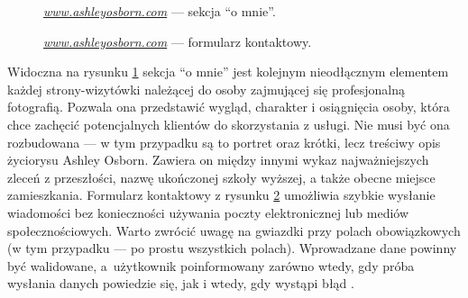 \documentclass[a4paper, 12pt, twoside]{article}
\numberwithin{figure}{section}
\begin{document}
\begin{sloppypar}
\begin{figure}[H] 
    \centering
   \caption{\textit{\url{www.ashleyosborn.com}} --- sekcja ``o mnie''.}
   \label{fig:ashley-2.jpg}
\end{figure}

\begin{figure}[H] 
    \centering
   \caption{\textit{\url{www.ashleyosborn.com}} --- formularz kontaktowy.}
   \label{fig:ashley-3.jpg}
\end{figure}

\newpage

Widoczna na rysunku \ref{fig:ashley-2.jpg} sekcja ``o mnie'' jest kolejnym nieodłącznym elementem każdej strony-wizytówki należącej do osoby zajmującej się profesjonalną fotografią. Pozwala ona przedstawić wygląd, charakter i osiągnięcia osoby, która chce zachęcić potencjalnych klientów do skorzystania z usługi. Nie musi być ona rozbudowana --- w tym przypadku są to portret oraz krótki, lecz treściwy opis życiorysu Ashley Osborn. Zawiera on między innymi wykaz najważniejszych zleceń z przeszłości, nazwę ukończonej szkoły wyższej, a także obecne miejsce zamieszkania. Formularz kontaktowy z rysunku \ref{fig:ashley-3.jpg} umożliwia szybkie wysłanie wiadomości bez konieczności używania poczty elektronicznej lub mediów społecznościowych. Warto zwrócić uwagę na gwiazdki przy polach obowiązkowych (w tym przypadku --- po prostu wszystkich polach). Wprowadzane dane powinny być walidowane, a~użytkownik poinformowany zarówno wtedy, gdy próba wysłania danych powiedzie się, jak i wtedy, gdy wystąpi błąd \cite{formularze}. 


\end{sloppypar}
\end{document}

